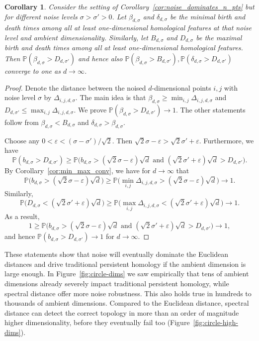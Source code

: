 \documentclass{article}
\theoremstyle{plain}
\newtheorem{corollary}[theorem]{Corollary}
\theoremstyle{definition}
\theoremstyle{remark}
\begin{document}
\begin{corollary}\label{cor:noise_dominates_ph}
    Consider the setting of Corollary~\ref{cor:noise_dominates_n_pts} but for different noise levels $\sigma > \sigma' > 0$. Let $\beta_{d,\sigma}$ and $\delta_{d,\sigma}$ be the minimal birth and death times among all at least one-dimensional homological features at that noise level and ambient dimensionality. Similarly, let $B_{d,\sigma}$ and $D_{d, \sigma}$ be the maximal birth and death times among all at least one-dimensional homological features. Then $\mathbb{P}(\beta_{d,\sigma} > D_{d, \sigma'})$ and hence also $\mathbb{P}(\beta_{d,\sigma} > B_{d, \sigma'}), \mathbb{P}(\delta_{d,\sigma} > D_{d, \sigma'})$ converge to one as $d\to \infty$.  
\end{corollary}
\begin{proof}
    Denote the distance between the noised $d$-dimensional points $i, j$ with noise level $\sigma$ by $\Delta_{i,j,d,\sigma}$.
    The main idea is that \mbox{$\beta_{d,\sigma}\geq \min_{i,j} \Delta_{i,j,d, \sigma}$} and $D_{d,\sigma'} \leq \max_{i,j} \Delta_{i,j,d, \sigma}$. We prove $\mathbb{P}(\beta_{d,\sigma} > D_{d, \sigma'}) \to 1$. The other statements follow from $\beta_{d, \sigma} < B_{d, \sigma}$ and $\delta_{d, \sigma} > \beta_{d, \sigma}$.

    Choose any  $0<\varepsilon < (\sigma -\sigma')/\sqrt{2}$. Then $\sqrt{2}\sigma -\varepsilon > \sqrt{2}\sigma' + \varepsilon$. Furthermore, we have  
    $$\mathbb{P}(b_{d,\sigma} > D_{d, \sigma'}) \geq \mathbb{P}\Big(b_{d,\sigma} > (\sqrt{2}\sigma -\varepsilon)\sqrt{d} \text{ and } (\sqrt{2}\sigma' + \varepsilon)\sqrt{d} > D_{d, \sigma'}\Big).$$ 
    By Corollary~\ref{cor:min_max_conv}, we have for $d\to \infty$ that
    $$\mathbb{P}\big(b_{d,\sigma} > (\sqrt{2}\sigma -\varepsilon)\sqrt{d}\big) \geq \mathbb{P}\big(\min_{i,j} \Delta_{i,j,d, \sigma} > (\sqrt{2}\sigma -\varepsilon)\sqrt{d}\big) \to 1.$$
    Similarly,
    $$\mathbb{P}\big(D_{d,\sigma} < (\sqrt{2}\sigma' +\varepsilon)\sqrt{d}\big) \geq \mathbb{P}\big(\max_{i,j} \Delta_{i,j,d, \sigma} < (\sqrt{2}\sigma' +\varepsilon)\sqrt{d}\big) \to 1.$$
    As a result,  
    $$1\geq\mathbb{P}\big(b_{d,\sigma} > (\sqrt{2}\sigma -\varepsilon)\sqrt{d} \text{ and } (\sqrt{2}\sigma' + \varepsilon)\sqrt{d} > D_{d, \sigma'}\big) \to 1,$$
    and hence $ \mathbb{P}(b_{d,\sigma} > D_{d, \sigma'}) \to 1$ for $d\to \infty$.
\end{proof}

These statements show that noise will eventually dominate the Euclidean distances and drive traditional persistent homology if the ambient dimension is large enough. In Figure~\ref{fig:circle-dims} we saw empirically that tens of ambient dimensions already severely impact traditional persistent homology, while spectral distance offer more noise robustness. This also holds true in hundreds to thousands of ambient dimensions. Compared to the Euclidean distance, spectral distance can detect the correct topology in more than an order of magnitude higher dimensionality, before they eventually fail too (Figure~\ref{fig:circle-high-dims}).
\end{document}
